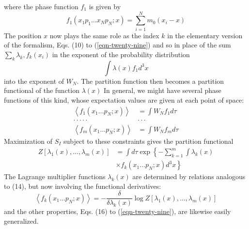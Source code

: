 \documentclass[]{article}
\begin{document}
where the phase function $f _{1}$ is given by
\begin{equation}
f _{1}\left( x _{1} p _{1} \ldots x _{ N } p _{ N } ; x \right)=\sum_{ i =1}^{ N } m _{0}\left( x _{ i }- x \right) \label{eqn-sixty-eight}
\end{equation}
The position $x$ now plays the same role as the index $k$ in the elementary version of the formalism, Eqs. (10) to (\ref{eqn-twenty-nine}) and so in place of the sum $\sum_{k} \lambda_{k}, f_{k}\left(x_{i}\right)$ in the exponent of the probability distribution
\begin{equation}
\int \lambda(x) f_{1} d^{3} x \nonumber
\end{equation}
into the exponent of $W _{ N }$. The partition function then becomes a partition functional of the function $\lambda( x )$ In general, we might have several phase functions of this kind, whose expectation values are given at each point of space:
\begin{align}
\left\langle f_{1}\left(x_{1} \ldots p_{N} ; x\right)\right\rangle &=\int W_{N} f_{1} d \tau \nonumber \\
\cdot \cdot \cdot \cdot \cdot & \cdot \cdot \cdot \label{eqn-sixty-nine}\\
\left\langle f_{m}\left(x_{1} \ldots p_{N} ; x\right)\right\rangle &=\int W_{N} f_{m} d \tau \nonumber
\end{align}
Maximization of $S_{I}$ subject to these constraints gives the partition functional
\begin{equation}
\begin{aligned}
Z \left[\lambda_{1}(x), \ldots, \lambda_{m}(x)\right] &=\int d \tau \exp \left\{-\sum_{ k =1}^{m} \int \lambda_{ k }( x )\right.\\
&\left.\times f _{ k }\left(x_{1} \ldots p _{ N } ; x \right) d ^{3} x \right\}
\end{aligned}
\end{equation}
The Lagrange multiplier functions $\lambda_{k}(x)$ are determined by relations analogous to (14), but now involving the functional derivatives:
\begin{equation}
\left\langle f _{ k }\left( x _{1} \ldots p _{ N } ; x \right)\right\rangle=-\frac{\delta}{\delta \lambda_{ k }( x )} \log Z \left[\lambda_{1}( x ), \ldots, \lambda_{ m }( x )\right]
\end{equation}
and the other properties, Eqs. (16) to (\ref{eqn-twenty-nine}), are likewise easily generalized. 
\end{document}
